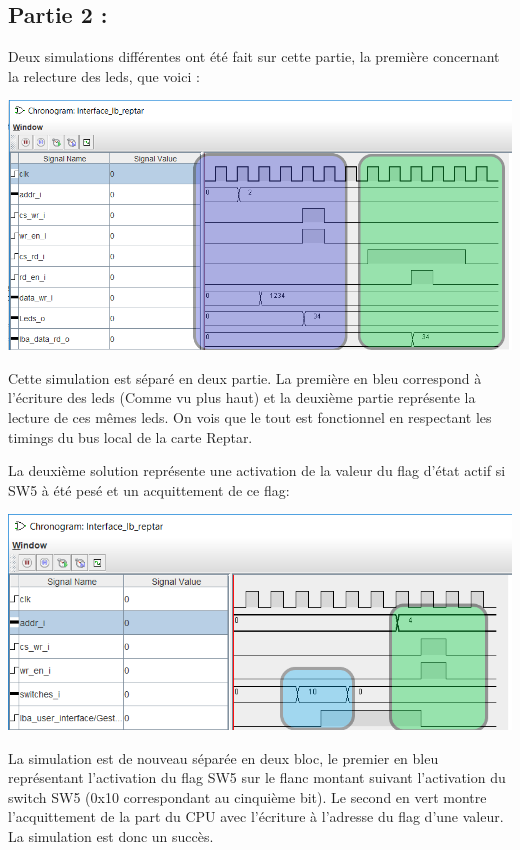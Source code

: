 \subsection*{Partie 2 :}
Deux simulations différentes ont été fait sur cette partie, la première concernant la relecture des leds, que voici :\\ 
\begin{center}
\includegraphics[scale=0.7]{./images/Test_Part2_Read_Write_Timing_Bus_Reptar.png}\\\par
{}
\end{center}\par
Cette simulation est séparé en deux partie. La première en bleu correspond à l'écriture des leds (Comme vu plus haut) et la deuxième partie représente la lecture de ces mêmes leds. On vois que le tout est fonctionnel en respectant les timings du bus local de la carte Reptar.\\\par
La deuxième solution représente une activation de la valeur du flag d'état actif si SW5 à été pesé et un acquittement de ce flag:
\begin{center}
\includegraphics[scale=0.8]{./images/Test_Part2_Flag_Timing_Bus_Reptar.png}\\\par
{}
\end{center}\par
La simulation est de nouveau séparée en deux bloc, le premier en bleu représentant l'activation du flag SW5 sur le flanc montant suivant l'activation du switch SW5 (0x10 correspondant au cinquième bit). Le second en vert montre l'acquittement de la part du CPU avec l'écriture à l'adresse du flag d'une valeur. La simulation est donc un succès.

